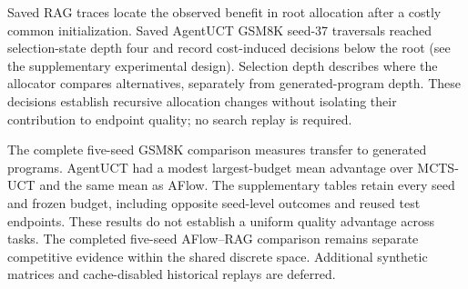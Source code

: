 Saved RAG traces locate the observed benefit in root allocation after a costly
common initialization. Saved AgentUCT GSM8K seed-37 traversals reached
selection-state depth four and record cost-induced decisions below the root
(see the supplementary experimental design). Selection depth describes where
the allocator compares alternatives, separately from generated-program depth.
These decisions establish recursive allocation changes without isolating
their contribution to endpoint quality; no search replay is required.

The complete five-seed GSM8K comparison measures transfer to generated
programs. AgentUCT had a modest largest-budget mean advantage over MCTS-UCT
and the same mean as AFlow. The supplementary tables retain every
seed and frozen budget, including opposite seed-level outcomes and reused
test endpoints. These results do not establish a uniform quality advantage
across tasks. The completed five-seed AFlow--RAG comparison remains separate
competitive evidence within the shared discrete space. Additional synthetic
matrices and cache-disabled historical replays are deferred.
